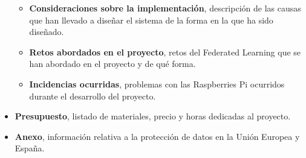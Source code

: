 \begin{itemize}
\begin{itemize}
            \item \textbf{Consideraciones sobre la implementación}, descripción de las causas que han llevado a diseñar el sistema de la forma en la que ha sido diseñado.
            \item \textbf{Retos abordados en el proyecto}, retos del Federated Learning que se han abordado en el proyecto y de qué forma.
            \item \textbf{Incidencias ocurridas}, problemas con las Raspberries Pi ocurridos durante el desarrollo del proyecto.
        \end{itemize}
    \item \textbf{Presupuesto}, listado de materiales, precio y horas dedicadas al proyecto.
    \item \textbf{Anexo}, información relativa a la protección de datos en la Unión Europea y España.
\end{itemize}

